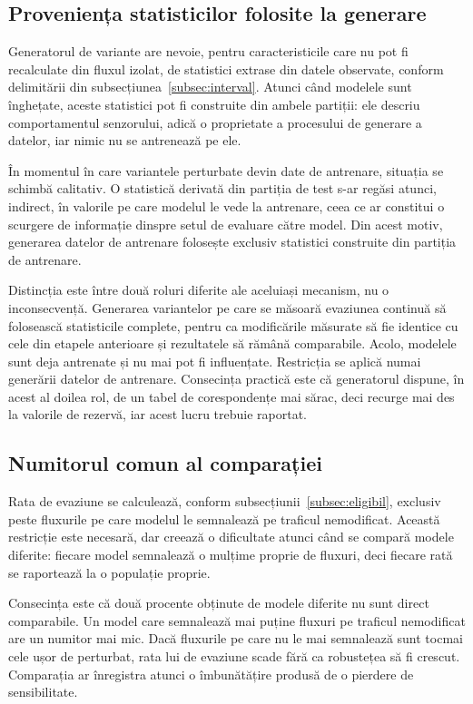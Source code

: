\subsection{Proveniența statisticilor folosite la generare}\label{subsec:provenienta}

Generatorul de variante are nevoie, pentru caracteristicile care nu pot fi recalculate din fluxul izolat, de statistici extrase din datele observate, conform delimitării din subsecțiunea~\ref{subsec:interval}. Atunci când modelele sunt înghețate, aceste statistici pot fi construite din ambele partiții: ele descriu comportamentul senzorului, adică o proprietate a procesului de generare a datelor, iar nimic nu se antrenează pe ele.

În momentul în care variantele perturbate devin date de antrenare, situația se schimbă calitativ. O statistică derivată din partiția de test s-ar regăsi atunci, indirect, în valorile pe care modelul le vede la antrenare, ceea ce ar constitui o scurgere de informație dinspre setul de evaluare către model. Din acest motiv, generarea datelor de antrenare folosește exclusiv statistici construite din partiția de antrenare.

Distincția este între două roluri diferite ale aceluiași mecanism, nu o inconsecvență. Generarea variantelor pe care se măsoară evaziunea continuă să folosească statisticile complete, pentru ca modificările măsurate să fie identice cu cele din etapele anterioare și rezultatele să rămână comparabile. Acolo, modelele sunt deja antrenate și nu mai pot fi influențate. Restricția se aplică numai generării datelor de antrenare. Consecința practică este că generatorul dispune, în acest al doilea rol, de un tabel de corespondențe mai sărac, deci recurge mai des la valorile de rezervă, iar acest lucru trebuie raportat.

\subsection{Numitorul comun al comparației}\label{subsec:cohorta}

Rata de evaziune se calculează, conform subsecțiunii~\ref{subsec:eligibil}, exclusiv peste fluxurile pe care modelul le semnalează pe traficul nemodificat. Această restricție este necesară, dar creează o dificultate atunci când se compară modele diferite: fiecare model semnalează o mulțime proprie de fluxuri, deci fiecare rată se raportează la o populație proprie.

Consecința este că două procente obținute de modele diferite nu sunt direct comparabile. Un model care semnalează mai puține fluxuri pe traficul nemodificat are un numitor mai mic. Dacă fluxurile pe care nu le mai semnalează sunt tocmai cele ușor de perturbat, rata lui de evaziune scade fără ca robustețea să fi crescut. Comparația ar înregistra atunci o îmbunătățire produsă de o pierdere de sensibilitate.

